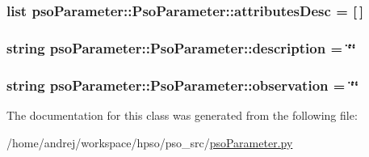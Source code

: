 \hypertarget{classpsoParameter_1_1PsoParameter_3178cbdb52114399fe03762520610f74}{
\subsubsection{\setlength{\rightskip}{0pt plus 5cm}list {\bf psoParameter::PsoParameter::attributesDesc} = \mbox{[}$\,$\mbox{]}}}
\label{classpsoParameter_1_1PsoParameter_3178cbdb52114399fe03762520610f74}


\hypertarget{classpsoParameter_1_1PsoParameter_c42553699bf96e2c7c62acad7997dc03}{
\subsubsection{\setlength{\rightskip}{0pt plus 5cm}string {\bf psoParameter::PsoParameter::description} = \char`\"{}\char`\"{}}}
\label{classpsoParameter_1_1PsoParameter_c42553699bf96e2c7c62acad7997dc03}


\hypertarget{classpsoParameter_1_1PsoParameter_29bd5d98ba56b35a7959b5dd2b9af44c}{
\subsubsection{\setlength{\rightskip}{0pt plus 5cm}string {\bf psoParameter::PsoParameter::observation} = \char`\"{}\char`\"{}}}
\label{classpsoParameter_1_1PsoParameter_29bd5d98ba56b35a7959b5dd2b9af44c}




The documentation for this class was generated from the following file:\begin{CompactItemize}
\item 
/home/andrej/workspace/hpso/pso\_\-src/\hyperlink{psoParameter_8py}{psoParameter.py}\end{CompactItemize}
